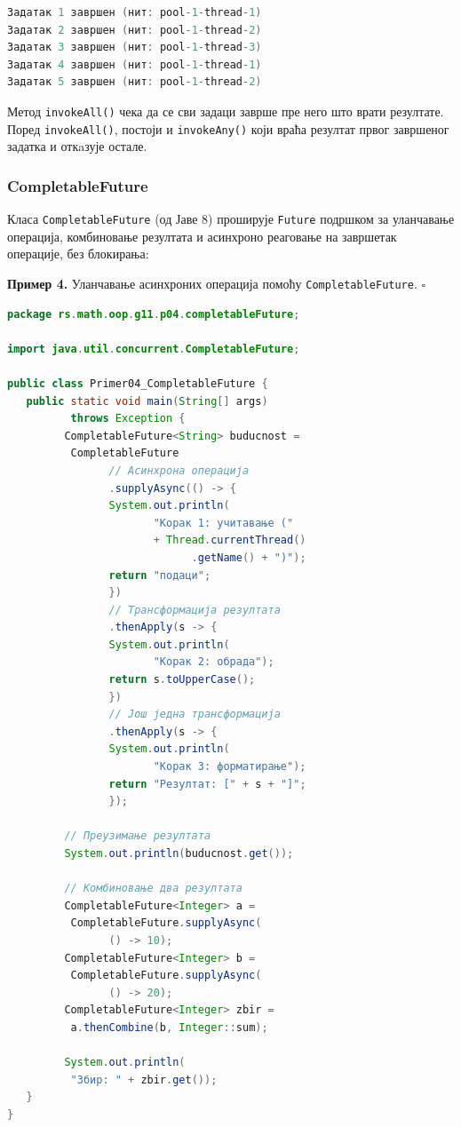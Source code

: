 \begin{lstlisting}[language=Java]
Задатак 1 завршен (нит: pool-1-thread-1)
Задатак 2 завршен (нит: pool-1-thread-2)
Задатак 3 завршен (нит: pool-1-thread-3)
Задатак 4 завршен (нит: pool-1-thread-1)
Задатак 5 завршен (нит: pool-1-thread-2)
\end{lstlisting}


Метод \texttt{invokeAll()} чека да се сви задаци заврше пре него што врати резултате. Поред \texttt{invokeAll()}, постоји и \texttt{invokeAny()} који враћа резултат првог завршеног задатка и откaзује остале.


\subsubsection{CompletableFuture}

Класа \texttt{CompletableFuture} (од Јаве 8) проширује \texttt{Future} подршком за уланчавање операција, комбиновање резултата и асинхроно реаговање на завршетак операције, без блокирања:


\bigskip

\noindent \textbf{Пример 4.} Уланчавање асинхроних операција помоћу \texttt{CompletableFuture}. $\square$

\medskip


\begin{lstlisting}[language=Java]
package rs.math.oop.g11.p04.completableFuture;
 
import java.util.concurrent.CompletableFuture;
 
public class Primer04_CompletableFuture {
   public static void main(String[] args)
          throws Exception {
         CompletableFuture<String> buducnost =
          CompletableFuture
                // Асинхрона операција
                .supplyAsync(() -> {
                System.out.println(
                       "Корак 1: учитавање ("
                       + Thread.currentThread()
                             .getName() + ")");
                return "подаци";
                })
                // Трансформација резултата
                .thenApply(s -> {
                System.out.println(
                       "Корак 2: обрада");
                return s.toUpperCase();
                })
                // Још једна трансформација
                .thenApply(s -> {
                System.out.println(
                       "Корак 3: форматирање");
                return "Резултат: [" + s + "]";
                });
 
         // Преузимање резултата
         System.out.println(buducnost.get());
 
         // Комбиновање два резултата
         CompletableFuture<Integer> a =
          CompletableFuture.supplyAsync(
                () -> 10);
         CompletableFuture<Integer> b =
          CompletableFuture.supplyAsync(
                () -> 20);
         CompletableFuture<Integer> zbir =
          a.thenCombine(b, Integer::sum);
 
         System.out.println(
          "Збир: " + zbir.get());
   }
}
\end{lstlisting}


